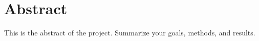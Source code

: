 \section*{Abstract}
This is the abstract of the project. Summarize your goals, methods, and results.
